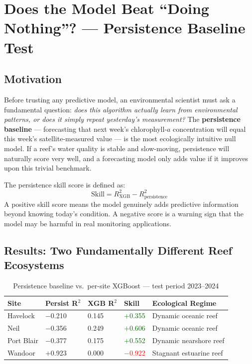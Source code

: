 \documentclass[12pt,a4paper]{report}
\begin{document}
\section{Does the Model Beat ``Doing Nothing''? — Persistence Baseline Test}
\label{sec:persistence}

\subsection{Motivation}

Before trusting any predictive model, an environmental scientist must ask a
fundamental question: \textit{does this algorithm actually learn from environmental
patterns, or does it simply repeat yesterday's measurement?} The
\textbf{persistence baseline} — forecasting that next week's chlorophyll-$a$
concentration will equal this week's satellite-measured value — is the most
ecologically intuitive null model. If a reef's water quality is stable and
slow-moving, persistence will naturally score very well, and a forecasting model
only adds value if it improves upon this trivial benchmark.

The persistence skill score is defined as:
\[
\text{Skill} = R^2_{\text{XGB}} - R^2_{\text{persistence}}
\]
A positive skill score means the model genuinely adds predictive information beyond
knowing today's condition. A negative score is a warning sign that the model may be
harmful in real monitoring applications.

\subsection{Results: Two Fundamentally Different Reef Ecosystems}

\begin{table}[H]
\centering
\caption{Persistence baseline vs.\ per-site XGBoost --- test period 2023--2024}
\begin{tabular}{L{3.2cm}R{2.3cm}R{2.3cm}R{2.3cm}L{3.5cm}}
\toprule
\textbf{Site} & \textbf{Persist R$^2$} & \textbf{XGB R$^2$} & \textbf{Skill} &
\textbf{Ecological Regime} \\
\midrule
{}
Havelock    & $-$0.210 & 0.145 & \textcolor{darkgreen}{$+$0.355} & Dynamic oceanic reef \\
Neil        & $-$0.356 & 0.249 & \textcolor{darkgreen}{$+$0.606} & Dynamic oceanic reef \\
Port Blair  & $-$0.377 & 0.175 & \textcolor{darkgreen}{$+$0.552} & Dynamic nearshore reef \\
Wandoor     & $+$0.923 & 0.000 & \textcolor{red}{$-$0.922}       & Stagnant estuarine reef \\
\bottomrule
\end{tabular}
\label{tab:persistence}
\end{table}
\end{document}
